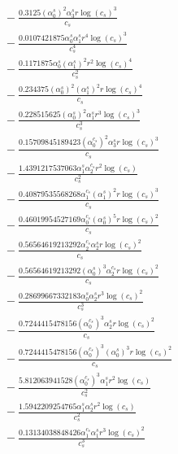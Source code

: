 \documentclass[10pt]{article}
\begin{document}
\begin{align*}
&{}  - \frac{0.3125 \left(\alpha_{0}^s\right)^{2} \alpha_{3}^s r \log{\left(c_{s} \right)}^{3}}{c_{s}} \\
&{}  - \frac{0.0107421875 \alpha_{0}^s \alpha_{1}^s r^{4} \log{\left(c_{s} \right)}^{3}}{c_{s}^{4}} \\
&{}  - \frac{0.1171875 \alpha_{0}^s \left(\alpha_{1}^s\right)^{2} r^{2} \log{\left(c_{s} \right)}^{4}}{c_{s}^{2}} \\
&{}  - \frac{0.234375 \left(\alpha_{0}^s\right)^{2} \left(\alpha_{1}^s\right)^{2} r \log{\left(c_{s} \right)}^{4}}{c_{s}} \\
&{}  - \frac{0.228515625 \left(\alpha_{0}^s\right)^{2} \alpha_{1}^s r^{3} \log{\left(c_{s} \right)}^{3}}{c_{s}^{3}} \\
&{}  - \frac{0.15709845189423 \left(\alpha_{0}^{c_s}\right)^{2} \alpha_{3}^s r \log{\left(c_{s} \right)}^{3}}{c_{s}} \\
&{}  - \frac{1.4391217537063 \alpha_{1}^s \alpha_{2}^{c_s} r^{2} \log{\left(c_{s} \right)}}{c_{s}^{2}} \\
&{}  - \frac{0.40879535568268 \alpha_{1}^{c_s} \left(\alpha_{1}^s\right)^{2} r \log{\left(c_{s} \right)}^{3}}{c_{s}} \\
&{}  - \frac{0.46019954527169 \alpha_{0}^{c_s} \left(\alpha_{0}^s\right)^{5} r \log{\left(c_{s} \right)}^{2}}{c_{s}} \\
&{}  - \frac{0.56564619213292 \alpha_{2}^{c_s} \alpha_{2}^s r \log{\left(c_{s} \right)}^{2}}{c_{s}} \\
&{}  - \frac{0.56564619213292 \left(\alpha_{0}^s\right)^{3} \alpha_{2}^{c_s} r \log{\left(c_{s} \right)}^{2}}{c_{s}} \\
&{}  - \frac{0.28699667332183 \alpha_{0}^s \alpha_{2}^s r^{3} \log{\left(c_{s} \right)}^{2}}{c_{s}^{3}} \\
&{}  - \frac{0.7244415478156 \left(\alpha_{0}^{c_s}\right)^{3} \alpha_{2}^s r \log{\left(c_{s} \right)}^{2}}{c_{s}} \\
&{}  - \frac{0.7244415478156 \left(\alpha_{0}^{c_s}\right)^{3} \left(\alpha_{0}^s\right)^{3} r \log{\left(c_{s} \right)}^{2}}{c_{s}} \\
&{}  - \frac{5.812063941528 \left(\alpha_{0}^{c_s}\right)^{3} \alpha_{1}^s r^{2} \log{\left(c_{s} \right)}}{c_{s}^{2}} \\
&{}  - \frac{1.5942209254765 \alpha_{1}^s \alpha_{2}^s r^{2} \log{\left(c_{s} \right)}}{c_{s}^{2}} \\
&{}  - \frac{0.13134038848426 \alpha_{1}^{c_s} \alpha_{1}^s r^{3} \log{\left(c_{s} \right)}^{2}}{c_{s}^{3}} \\

\end{align*}
\end{document}
